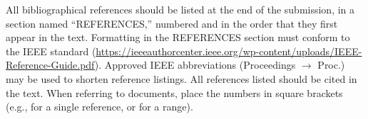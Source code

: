 \documentclass{article}
\begin{document}
All bibliographical references should be listed at the end of the submission, in a section named ``REFERENCES,''
numbered and in the order that they first appear in the text. Formatting in the REFERENCES section must conform to the
IEEE standard (\url{https://ieeeauthorcenter.ieee.org/wp-content/uploads/IEEE-Reference-Guide.pdf}). Approved
IEEE abbreviations (Proceedings $\rightarrow$ Proc.) may be used to shorten reference listings. All references listed
should be cited in the text. When referring to documents, place the numbers in square brackets (e.g., \cite{ISMIR17Author:01}
for a single reference, or \cite{JNMR10Someone:01,Book20Person:01,Chapter09Person:01} for a range).




%
%
%
%
%
\end{document}
